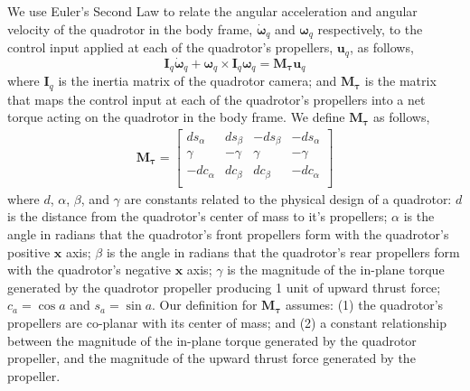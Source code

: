 We use Euler's Second Law to relate the angular acceleration and angular velocity of the quadrotor in the body frame, $\dot{\mathbf{\omega}}_q$ and $\mathbf{\omega}_q$ respectively, to the control input applied at each of the quadrotor's propellers, $\mathbf{u}_q$, as follows,
%
\begin{equation}
\mathbf{I}_{q} \dot{\mathbf{\omega}}_q + \mathbf{\omega}_q \times \mathbf{I}_q \mathbf{\omega}_q = \mathbf{M}_{\mathbf{\tau}} \mathbf{u}_q
\label{eqn:ch2:M_t_u_q_short}
\end{equation}
%
where $\mathbf{I}_{q}$ is the inertia matrix of the quadrotor camera; and $\mathbf{M}_{\mathbf{\tau}}$ is the matrix that maps the control input at each of the quadrotor's propellers into a net torque acting on the quadrotor in the body frame.
We define $\mathbf{M}_{\mathbf{\tau}}$ as follows, 
%
\begin{equation}
\begin{aligned}
%
\mathbf{M}_{\mathbf{\tau}} =
\begin{bmatrix}
 ds_\alpha & ds_\beta & -ds_\beta & -ds_\alpha \\
\gamma     & -\gamma  & \gamma    & -\gamma    \\
-dc_\alpha & dc_\beta & dc_\beta  & -dc_\alpha \\
\end{bmatrix}
%
\end{aligned}
\end{equation}
%
where $d$, $\alpha$, $\beta$, and $\gamma$ are constants related to the physical design of a quadrotor:
$d$ is the distance from the quadrotor's center of mass to it's propellers;
$\alpha$ is the angle in radians that the quadrotor's front propellers form with the quadrotor's positive $\mathbf{x}$ axis;
$\beta$ is the angle in radians that the quadrotor's rear propellers form with the quadrotor's negative $\mathbf{x}$ axis;
$\gamma$ is the magnitude of the in-plane torque generated by the quadrotor propeller producing 1 unit of upward thrust force;
$c_a=\cos a$ and $s_a=\sin a$.
Our definition for $\mathbf{M}_{\mathbf{\tau}}$ assumes: (1) the quadrotor's propellers are co-planar with its center of mass; and (2) a constant relationship between the magnitude of the in-plane torque generated by the quadrotor propeller, and the magnitude of the upward thrust force generated by the propeller. 


